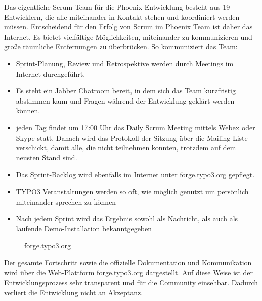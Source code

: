 Das eigentliche Scrum-Team für die Phoenix Entwicklung besteht aus 19 Entwicklern\cite{bib:forge}, die alle miteinander in Kontakt stehen und koordiniert werden müssen. Entscheidend für den Erfolg von Scrum im Phoenix Team ist daher das Internet. Es bietet vielfältige Möglichkeiten, miteinander zu kommunizieren und große räumliche Entfernungen zu überbrücken. So kommuniziert das Team:
\begin{itemize}
\item Sprint-Planung, Review und Retrospektive werden durch Meetings im Internet durchgeführt.
\item Es steht ein Jabber Chatroom bereit, in dem sich das Team kurzfristig abstimmen kann und Fragen während der Entwicklung geklärt werden können.
\item jeden Tag findet um 17:00 Uhr das Daily Scrum Meeting mittels Webex oder Skype statt. Danach wird das Protokoll der Sitzung über die Mailing Liste verschickt, damit alle, die nicht teilnehmen konnten, trotzdem auf dem neusten Stand sind.
\item Das Sprint-Backlog wird ebenfalls im Internet unter forge.typo3.org\cite{bib:forge} gepflegt.
\item TYPO3 Veranstaltungen werden so oft, wie möglich genutzt um persönlich miteinander sprechen zu können
\item Nach jedem Sprint wird das Ergebnis sowohl als Nachricht, als auch als laufende Demo-Installation bekanntgegeben\cite{bib:agiler-phoenix}
\end{itemize}

\begin{figure}[h]
	\centering
	\caption{forge.typo3.org\cite{bib:forge}}
	\label{forge}
\end{figure}
Der gesamte Fortschritt sowie die offizielle Dokumentation und Kommunikation wird über die Web-Plattform forge.typo3.org dargestellt. Auf diese Weise ist der Entwicklungsprozess sehr transparent und für die Community einsehbar\cite{bib:scrumify}. Dadurch verliert die Entwicklung nicht an Akzeptanz.

